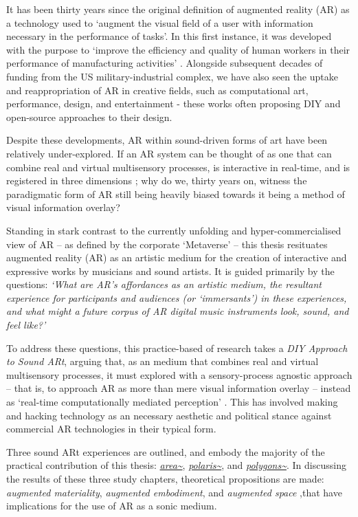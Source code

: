 \begin{SingleSpace}
    It has been thirty years since the original definition of augmented reality (AR) as a technology used to `augment the visual field of a user with information necessary in the performance of tasks'. In this first instance, it was developed with the purpose to `improve the efficiency and quality of human workers in their performance of manufacturing activities' \citep{caudell1992}. Alongside subsequent decades of funding from the US military-industrial complex, we have also seen the uptake and reappropriation of AR in creative fields, such as computational art, performance, design, and entertainment - these works often proposing DIY and open-source approaches to their design. 

    Despite these developments, AR within sound-driven forms of art have been relatively under-explored. If an AR system can be thought of as one that can combine real and virtual multisensory processes, is interactive in real-time, and is registered in three dimensions \citep{azuma1997}; why do we, thirty years on, witness the paradigmatic form of AR still being heavily biased \citep{billinghurst2015} towards it being a method of visual information overlay?
    
    Standing in stark contrast to the currently unfolding and hyper-commercialised view of AR --  as defined by the corporate `Metaverse' --  this thesis resituates augmented reality (AR) as an artistic medium for the creation of interactive and expressive works by musicians and sound artists. It is guided primarily by the questions: \textit{`What are AR's affordances as an artistic medium, the resultant experience for participants and audiences (or `immersants') in these experiences, and what might a future corpus of AR digital music instruments look, sound, and feel like?'}
    
    To address these questions, this practice-based of research takes a \textit{DIY Approach to Sound ARt}, arguing that, as an medium that combines real and virtual multisensory processes, it must explored with a sensory-process agnostic approach -- that is, to approach AR as more than mere visual information overlay -- instead as `real-time computationally mediated perception' \citep{chevalier2020}. This has involved making and hacking technology as an necessary aesthetic and political stance against commercial AR technologies in their typical form.
    
    Three sound ARt experiences are outlined, and embody the majority of the practical contribution of this thesis: \textit{\href{https://github.com/sambilbow/area}{area\textasciitilde{}}}, \textit{\href{https://github.com/sambilbow/polaris}{polaris\textasciitilde{}}}, and \textit{\href{https://github.com/sambilbow/polygons}{polygons\textasciitilde{}}}. In discussing the results of these three study chapters, theoretical propositions are made: \textit{augmented materiality}, \textit{augmented embodiment}, and \textit{augmented space} ,that have implications for the use of AR as a sonic medium.
    

\end{SingleSpace}
